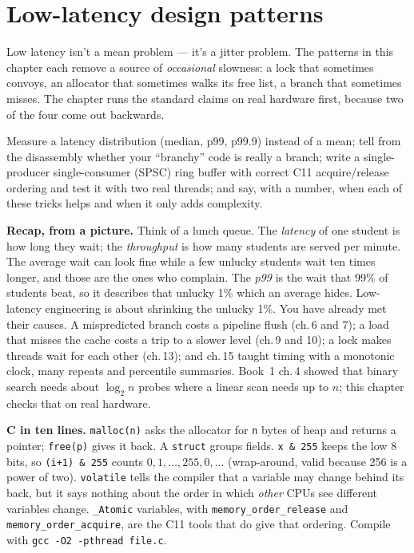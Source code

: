\chapter{Low-latency design patterns}
\label{ch:systems17}

Low latency isn't a mean problem --- it's a jitter problem. The
patterns in this chapter each remove a source of \emph{occasional}
slowness: a lock that sometimes convoys, an allocator that
sometimes walks its free list, a branch that sometimes misses.
The chapter runs the standard claims on real hardware first,
because two of the four come out backwards.

\begin{wins}
Measure a latency distribution (median, p99, p99.9) instead of a
mean; tell from the disassembly whether your ``branchy'' code is
really a branch; write a single-producer single-consumer (SPSC) ring
buffer with correct C11 acquire/release ordering and test it with two
real threads; and say, with a number, when each of these tricks helps
and when it only adds complexity.
\end{wins}

\begin{rulebox}
\textbf{Recap, from a picture.} Think of a lunch queue. The
\emph{latency} of one student is how long they wait; the
\emph{throughput} is how many students are served per minute. The
average wait can look fine while a few unlucky students wait ten times
longer, and those are the ones who complain. The \emph{p99} is the
wait that 99\% of students beat, so it describes that unlucky 1\%
which an average hides. Low-latency engineering is about shrinking
the unlucky 1\%. You have already met their causes. A mispredicted
branch costs a pipeline flush (ch.\,6 and 7); a load that misses the
cache costs a trip to a slower level (ch.\,9 and 10); a lock makes
threads wait for each other (ch.\,13); and ch.\,15 taught timing with
a monotonic clock, many repeats and percentile summaries. Book~1
ch.\,4 showed that binary search needs about $\log_2 n$ probes where
a linear scan needs up to $n$; this chapter checks that on real
hardware.

\textbf{C in ten lines.} \texttt{malloc(n)} asks the allocator for
\texttt{n} bytes of heap and returns a pointer; \texttt{free(p)} gives
it back. A \texttt{struct} groups fields. \texttt{x \& 255} keeps the
low 8 bits, so \texttt{(i+1) \& 255} counts $0,1,\dots,255,0,\dots$
(wrap-around, valid because 256 is a power of two). \texttt{volatile}
tells the compiler that a variable may change behind its back, but it
says nothing about the order in which \emph{other} CPUs see
different variables change. \texttt{\_Atomic} variables, with
\texttt{memory\_order\_release} and \texttt{memory\_order\_acquire},
are the C11 tools that do give that ordering. Compile with
\texttt{gcc -O2 -pthread file.c}.
\end{rulebox}

